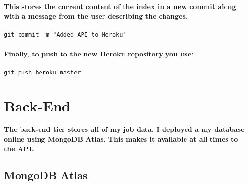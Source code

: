 \paragraph{This stores the current content of the index in a new commit along with a message from the user describing the changes.}
\begin{verbatim}
git commit -m "Added API to Heroku"
\end{verbatim}
\paragraph{Finally, to push to the new Heroku repository you use:}
\begin{verbatim}
git push heroku master
\end{verbatim}

\section{Back-End}
\paragraph{The back-end tier stores all of my job data. I deployed a my database online using MongoDB Atlas. This makes it available at all times to the API. }
\subsection{MongoDB Atlas}

